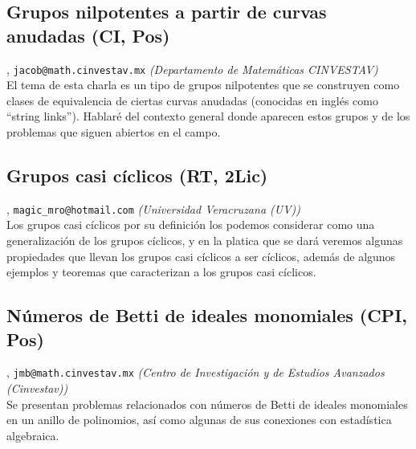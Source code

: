 \subsection{\sffamily Grupos nilpotentes a partir de curvas anudadas {\footnotesize (CI, Pos)}} \label{reg-870} 
, {\tt jacob@math.cinvestav.mx}  {\slshape (Departamento de Matem\'aticas CINVESTAV)}\\
          \noindent El tema de esta charla es un tipo de grupos nilpotentes que se construyen como clases de equivalencia de ciertas curvas anudadas (conocidas en ingl\'es como ``string links''). Hablar\'e del contexto general donde aparecen estos grupos y de los problemas que siguen abiertos en el campo.
\subsection{\sffamily Grupos casi c\'iclicos {\footnotesize (RT, 2Lic)}} \label{reg-419} 
, {\tt magic\_mro@hotmail.com}  {\slshape (Universidad Veracruzana (UV))}\\
          \noindent Los grupos casi c\'iclicos por su definici\'on los  podemos considerar  como una generalizaci\'on de los grupos c\'iclicos, y en la platica que se dar\'a  veremos algunas propiedades que llevan los grupos casi c\'iclicos a ser  c\'iclicos, adem\'as de algunos ejemplos y teoremas que caracterizan a los  grupos casi c\'iclicos.
\subsection{\sffamily N\'umeros de Betti de ideales monomiales {\footnotesize (CPI, Pos)}} \label{reg-1161} 
, {\tt jmb@math.cinvestav.mx}  {\slshape (Centro de Investigaci\'on y de Estudios Avanzados (Cinvestav))}\\
          \noindent Se presentan problemas relacionados con n\'umeros de Betti de ideales monomiales en un anillo de polinomios, as\'i como algunas de sus conexiones con estad\'istica algebraica.
